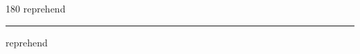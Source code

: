 
\begin{frame}
\begin{center}
\begin{turn}{180}
{\fontsize{2.5cm}{1em}\selectfont reprehend}
\end{turn}
\vspace{1em}\par  
\hrule
\vspace{1em}\par  
{\fontsize{2.5cm}{1em}\selectfont reprehend}
\end{center}
\end{frame}
